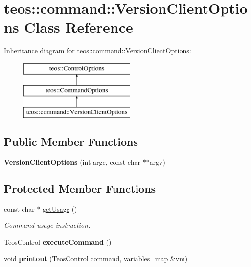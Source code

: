 \hypertarget{classteos_1_1command_1_1_version_client_options}{}\section{teos\+:\+:command\+:\+:Version\+Client\+Options Class Reference}
\label{classteos_1_1command_1_1_version_client_options}
Inheritance diagram for teos\+:\+:command\+:\+:Version\+Client\+Options\+:\begin{figure}[H]
\begin{center}
\leavevmode
\includegraphics[height=3.000000cm]{classteos_1_1command_1_1_version_client_options}
\end{center}
\end{figure}
\subsection*{Public Member Functions}
\begin{DoxyCompactItemize}
\item 
\mbox{\label{classteos_1_1command_1_1_version_client_options_a989412affdf0f88746ddb855434412e6}} 
{\bfseries Version\+Client\+Options} (int argc, const char $\ast$$\ast$argv)
\end{DoxyCompactItemize}
\subsection*{Protected Member Functions}
\begin{DoxyCompactItemize}
\item 
const char $\ast$ \mbox{\hyperlink{classteos_1_1command_1_1_version_client_options_a28b69107e8eb50a2faf9594958bb1d6d}{get\+Usage}} ()
\begin{DoxyCompactList}\small\item\em Command \textquotesingle{}usage\textquotesingle{} instruction. \end{DoxyCompactList}\item 
\mbox{\label{classteos_1_1command_1_1_version_client_options_a8cd89cab3d5a38971de1c75facc7a47d}} 
\mbox{\hyperlink{classteos_1_1_teos_control}{Teos\+Control}} {\bfseries execute\+Command} ()
\item 
\mbox{\label{classteos_1_1command_1_1_version_client_options_a1b6021ecadaaed16af399487d573b9f1}} 
void {\bfseries printout} (\mbox{\hyperlink{classteos_1_1_teos_control}{Teos\+Control}} command, variables\+\_\+map \&vm)
\end{DoxyCompactItemize}
